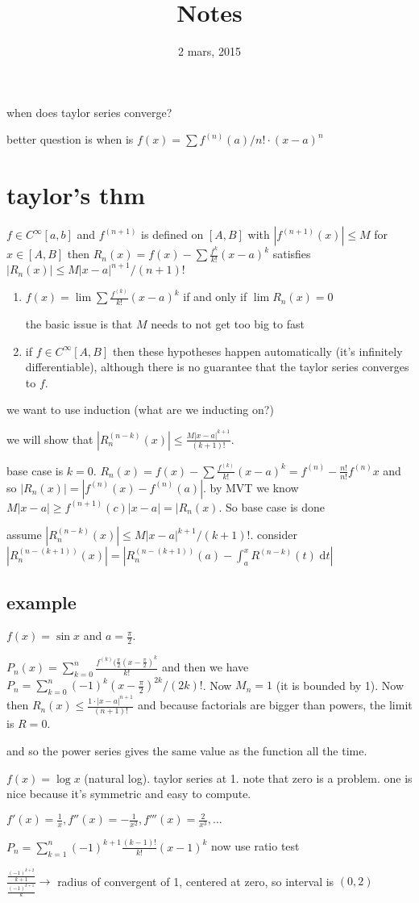 \documentclass[letterpaper]{article}
\begin{document}
\title{Notes}
\date{2 mars, 2015}
\maketitle

when does taylor series converge?

better question is when is $f(x)=\sum\limits{f^{(n)}(a)/n!\cdot (x-a)^n}$


\section*{taylor's thm}
$f\in C^{\infty}[a,b]$ and $f^{(n+1)}$ is defined on $[A,B]$ with $|f^{(n+1)}(x)|\le M$ for $x\in [A,B]$ then $R_n(x)=f(x)-\sum{\frac{f^{k}}{k!}(x-a)^k}$ satisfies $|R_n(x)|\le M|x-a|^{n+1}/(n+1)!$
\begin{enumerate}
\item
$f(x)=\lim\sum\frac{f^{(k)}}{k!}(x-a)^k$ if and only if $\lim R_n(x)=0$

the basic issue is that $M$ needs to not get too big to fast
\item
if $f\in C^\infty[A,B]$ then these hypotheses happen automatically (it's infinitely differentiable), although there is no guarantee that the taylor series converges to $f$.
\end{enumerate}

we want to use induction (what are we inducting on?)

we will show that $|R_n^{(n-k)}(x)|\le\frac{M|x-a|^{k+1}}{(k+1)!}$.

base case is $k=0$. $R_n(x)=f(x)-\sum{\frac{f^{(k)}}{k!}(x-a)^k}=f^{(n)}-\frac{n!}{n!}f^{(n)}x$ and so $|R_n(x)|=|f^{(n)}(x)-f^{(n)}(a)|$. by MVT we know $M|x-a|\ge f^{(n+1)}(c)|x-a|=|R_n(x)$. So base case is done

assume $|R_n^{(n-k)}(x)|\le M|x-a|^{k+1}/(k+1)!$. consider $|R_n^{(n-(k+1))}(x)|=|R_n^{(n-(k+1))}(a)-\int_a^x{R^{(n-k)}(t)\;\mathrm{d}t}|$

\subsection*{example}
$f(x)=\sin x$ and $a=\frac{\pi}{2}$.

$P_n(x)=\sum\limits_{k=0}^n{\frac{f^{(k)}(\frac{\pi}{2}(x-\frac{\pi}{2})^k}{k!}}$ and then we have $P_n=\sum\limits_{k=0}^n{(-1)^k(x-\frac{\pi}{2})^{2k}}/(2k)!$. Now $M_n=1$ (it is bounded by 1). Now then $R_n(x)\le \frac{1\cdot |x-a|^{n+1}}{(n+1)!}$ and because factorials are bigger than powers,  the limit is $R=0$.

and so the power series gives the same value as the function all the time.

$f(x)=\log x$ (natural log). taylor series at 1. note that zero is a problem. one is nice because it's symmetric and easy to compute.

$f'(x)=\frac{1}{x}, f''(x)=-\frac{1}{x^2}, f'''(x)=\frac{2}{x^3},\dots$

$P_n=\sum\limits_{k=1}^n{(-1)^{k+1}\frac{(k-1)!}{k!}(x-1)^k}$ now use ratio test

$\frac{\frac{(-1)^{k+2}}{k+1}}{\frac{(-1)^{k+1}}{k}}\to$ radius of convergent of 1, centered at zero, so interval is $(0,2)$
\end{document}
